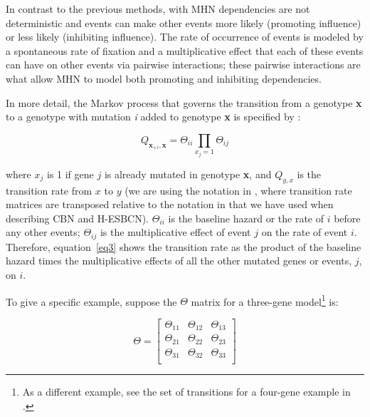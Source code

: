 \documentclass[a4paper,11pt]{article}
\begin{document}
In contrast to the previous methods, with MHN \citep{schill2020modelling} dependencies are not deterministic and events can make other events more likely (promoting influence) or less likely (inhibiting influence). The rate of occurrence of events is modeled by a spontaneous rate of fixation and a multiplicative effect that each of these events can have on other events via pairwise interactions; these pairwise interactions are what allow MHN to model both promoting and inhibiting dependencies.


In more detail, the Markov process that governs the transition from a genotype \textbf{x} to a genotype with mutation \textit{i} added to genotype \textbf{x} is specified by \citep[eq.~2]{schill2020modelling}:

\begin{equation}\label{eq3}
  Q_{\mathbf{x}_{+i},\mathbf{x}} = \Theta_{ii} \prod\limits_{x_j = 1} \Theta_{ij}
\end{equation}


\flushleft where   $x_j$ is 1 if gene $j$ is already mutated in genotype \textbf{x}, and $Q_{y,x}$ is the transition rate from $x$ to $y$ (we are using the notation in \citealp{schill2020modelling}, where transition rate matrices are transposed relative to the notation in \citealp{montazeri2016large} that we have used when describing CBN and H-ESBCN). %
$\Theta_{ii}$ is the baseline hazard or the rate of $i$ before any other events; $\Theta_{ij}$ is the multiplicative effect of event $j$ on the rate of event $i$. Therefore, equation~\ref{eq3} shows the transition rate as the product of the baseline hazard times the multiplicative effects of all the other mutated genes or events, $j$, on $i$.


To give a specific example, suppose the $\Theta$ matrix for a three-gene model\footnote{As a different example, see the set of transitions for a four-gene example in \citealp[Fig.~2]{schill2020modelling}.} is:

\begin{equation}
  \Theta = 
  \begin{bmatrix}
    \Theta_{11} & \Theta_{12} & \Theta_{13} \\
    \Theta_{21} & \Theta_{22} & \Theta_{23} \\
    \Theta_{31} & \Theta_{32} & \Theta_{33} \\
  \end{bmatrix}
\end{equation}
\end{document}
